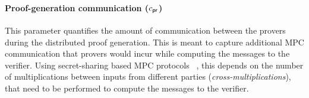 \paragraph{Proof-generation communication ($c_\mathsf{pr}$)}
This parameter quantifies the amount of communication between the provers during the
distributed proof generation. This is meant to capture additional MPC
communication that provers would incur while computing the messages to the
verifier. Using secret-sharing based MPC protocols ~\cite{GMW87, BGW88, SPDZ},
this depends on the number of multiplications between inputs from different
parties ({\em cross-multiplications}), that need to be performed to compute the
messages to the verifier. 


